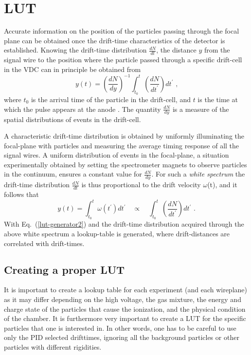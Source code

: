 \documentclass[11pt]{report}
\begin{document}
\section{LUT}\label{sec:newdatLUT}


Accurate information on the position of the particles passing through the focal
plane can be obtained once the drift-time characteristics of the detector is established. 
Knowing the drift-time distribution $\frac{dN}{dt}$, the
distance $y$ from the signal wire to the position where the particle passed through a 
specific drift-cell in the VDC can in principle be obtained from 
\begin{equation}
y(t)=(\frac{dN}{dy})^{-1} \int_{t_{0}}^{t}
\left( \frac{dN}{dt^{\prime }} \right) dt^{\prime }
\textrm{ ,}  
\label{lut-generator}
\end{equation} 
where $t_{0}$ is the arrival time of the particle in the drift-cell, and 
$t$ is the time at which  the pulse appears at the anode \cite{Ber77}.
The quantity $\frac{dN}{dy}$ is a measure of the spatial distributions 
of events in the drift-cell.

A characteristic drift-time distribution is obtained by uniformly 
illuminating the focal-plane with particles and measuring the
average timing response of all the signal wires. 
A uniform distribution of events in the focal-plane,
a situation experimentally obtained by setting the spectrometer magnets to observe particles
in the continuum, ensures a constant value for $\frac{dN}{dy}$.
For such a {\it white spectrum} the drift-time distribution $\frac{dN}{dt}$
is thus proportional to the drift velocity $\omega$(t), and it
follows that 
\begin{equation}
y(t)=\int_{t_{0}}^{t} \omega(t^{\prime}) dt^{\prime }
\quad  \propto  \quad \int_{t_{0}}^{t}
\left( \frac{dN}{dt^{\prime }} \right) dt^{\prime }
\textrm{ .}  
\label{lut-generator2}
\end{equation} 
With Eq.~(\ref{lut-generator2}) and the drift-time distribution
acquired through the above white spectrum a lookup-table is generated, 
where drift-distances are correlated with drift-times.

\subsection{Creating a proper LUT}\label{sec:LUTcreation}

It is important to create a lookup table for each experiment (and each wireplane)
as it may differ depending on the high voltage, the gas mixture, the energy and charge state of the particles
that cause the ionization, and the physical condition of the chamber.  
It is furthermore very important to create a LUT for the specific particles 
that one is interested in. 
In other words, one has to be careful to use only the PID selected drifttimes,
ignoring all the background particles or other particles with different rigidities.
\end{document}
